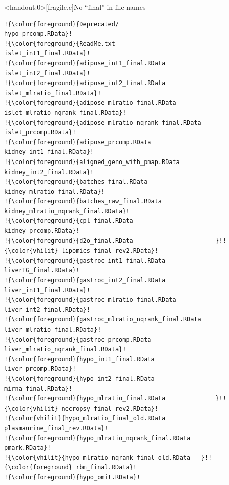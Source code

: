 \documentclass[12pt,t]{beamer}
\begin{document}
\begin{frame}<handout:0>[fragile,c]{No ``{\hilit final}'' in file names}


\addtocounter{framenumber}{-1}

\begin{center}
\begin{minipage}[c]{9.5cm}
\begin{semiverbatim}
\lstset{basicstyle=\tiny}
\begin{lstlisting}[escapechar=!,linewidth=9.5cm]
!{\color{foreground}{Deprecated/                            hypo_prcomp.RData}!
!{\color{foreground}{ReadMe.txt                             islet_int1_final.RData}!
!{\color{foreground}{adipose_int1_final.RData               islet_int2_final.RData}!
!{\color{foreground}{adipose_int2_final.RData               islet_mlratio_final.RData}!
!{\color{foreground}{adipose_mlratio_final.RData            islet_mlratio_nqrank_final.RData}!
!{\color{foreground}{adipose_mlratio_nqrank_final.RData     islet_prcomp.RData}!
!{\color{foreground}{adipose_prcomp.RData                   kidney_int1_final.RData}!
!{\color{foreground}{aligned_geno_with_pmap.RData           kidney_int2_final.RData}!
!{\color{foreground}{batches_final.RData                    kidney_mlratio_final.RData}!
!{\color{foreground}{batches_raw_final.RData                kidney_mlratio_nqrank_final.RData}!
!{\color{foreground}{cpl_final.RData                        kidney_prcomp.RData}!
!{\color{foreground}{d2o_final.RData                       }!!{\color{vhilit} lipomics_final_rev2.RData}!
!{\color{foreground}{gastroc_int1_final.RData               liverTG_final.RData}!
!{\color{foreground}{gastroc_int2_final.RData               liver_int1_final.RData}!
!{\color{foreground}{gastroc_mlratio_final.RData            liver_int2_final.RData}!
!{\color{foreground}{gastroc_mlratio_nqrank_final.RData     liver_mlratio_final.RData}!
!{\color{foreground}{gastroc_prcomp.RData                   liver_mlratio_nqrank_final.RData}!
!{\color{foreground}{hypo_int1_final.RData                  liver_prcomp.RData}!
!{\color{foreground}{hypo_int2_final.RData                  mirna_final.RData}!
!{\color{foreground}{hypo_mlratio_final.RData              }!!{\color{vhilit} necropsy_final_rev2.RData}!
!{\color{vhilit}{hypo_mlratio_final_old.RData           plasmaurine_final_rev.RData}!
!{\color{foreground}{hypo_mlratio_nqrank_final.RData        pmark.RData}!
!{\color{vhilit}{hypo_mlratio_nqrank_final_old.RData   }!!{\color{foreground} rbm_final.RData}!
!{\color{foreground}{hypo_omit.RData}!
\end{lstlisting}
\end{semiverbatim}
\end{minipage}
\end{center}


\end{frame}
\end{document}
